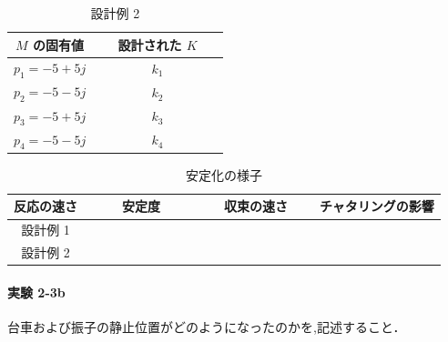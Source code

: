 \begin{table}[h]
  \centering
  \caption{設計例 2}
  \label{tab:design_example_2}
  \begin{tabular}{|c|c|}
    \hline
    \( M \) の固有値    & 設計された \( K \)                            \\
    \hline
    \( p_1 = -5 + 5j \) & \( k_1 \) {\large\textbf{　　　　　　　　}}   \\
    \( p_2 = -5 - 5j \) & \( k_2 \)   {\large\textbf{　　　　　　　　}} \\
    \( p_3 = -5 + 5j \) & \( k_3 \)   {\large\textbf{　　　　　　　　}} \\
    \( p_4 = -5 - 5j \) & \( k_4 \)   {\large\textbf{　　　　　　　　}} \\
    \hline
  \end{tabular}
\end{table}

\begin{table}[h]
  \centering
  \caption{安定化の様子}
  \label{tab:stabilization_observation}
  \begin{tabular}{|c|c|c|c|}
    \hline
    反応の速さ & 安定度                            & 収束の速さ                        & チャタリングの影響                \\
    \hline
    設計例 1   & {\large\textbf{　　　　　　　　}} & {\large\textbf{　　　　　　　　}} & {\large\textbf{　　　　　　　　}} \\
    設計例 2   & {\large\textbf{　　　　　　　　}} & {\large\textbf{　　　　　　　　}} & {\large\textbf{　　　　　　　　}} \\
    \hline
  \end{tabular}
\end{table}

\paragraph{実験 2-3b}
台車および振子の静止位置がどのようになったのかを,記述すること．

